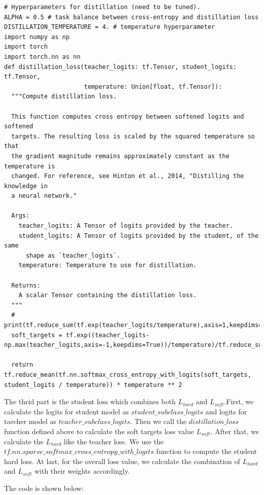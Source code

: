\documentclass[conference]{IEEEtran}
\begin{document}
\begin{lstlisting}
# Hyperparameters for distillation (need to be tuned).
ALPHA = 0.5 # task balance between cross-entropy and distillation loss
DISTILLATION_TEMPERATURE = 4. # temperature hyperparameter
import numpy as np
import torch
import torch.nn as nn
def distillation_loss(teacher_logits: tf.Tensor, student_logits: tf.Tensor,
                      temperature: Union[float, tf.Tensor]):
  """Compute distillation loss.

  This function computes cross entropy between softened logits and softened
  targets. The resulting loss is scaled by the squared temperature so that
  the gradient magnitude remains approximately constant as the temperature is
  changed. For reference, see Hinton et al., 2014, "Distilling the knowledge in
  a neural network."

  Args:
    teacher_logits: A Tensor of logits provided by the teacher.
    student_logits: A Tensor of logits provided by the student, of the same
      shape as `teacher_logits`.
    temperature: Temperature to use for distillation.

  Returns:
    A scalar Tensor containing the distillation loss.
  """
  # print(tf.reduce_sum(tf.exp(teacher_logits/temperature),axis=1,keepdims=True).shape)
  soft_targets = tf.exp((teacher_logits-np.max(teacher_logits,axis=-1,keepdims=True))/temperature)/tf.reduce_sum(tf.exp(np.max(teacher_logits,axis=-1,keepdims=True)/temperature),axis=1,keepdims=True)

  return tf.reduce_mean(tf.nn.softmax_cross_entropy_with_logits(soft_targets, student_logits / temperature)) * temperature ** 2

\end{lstlisting}
The thrid part is the student loss which combines both $L_{hard}$ and $L_{soft}$.First, we calculate the logits for student model as $student\_subclass\_logits$ and logits for taecher model as $teacher\_subclass\_logits$.
Then we call the $distillation\_loss$ function defined above to calculate the soft targets loss value $L_{soft}$.
After that, we calculate the $L_{hard}$ like the teacher loss. We use the $tf.nn.sparse\_softmax\_cross\_entropy\_with\_logits$ function to compute the student hard loss.
At last, for the overall loss value, we calculate the combination of $L_{hard}$ and $L_{soft}$ with their weights accordingly.\par
The code is shown below:
\end{document}
